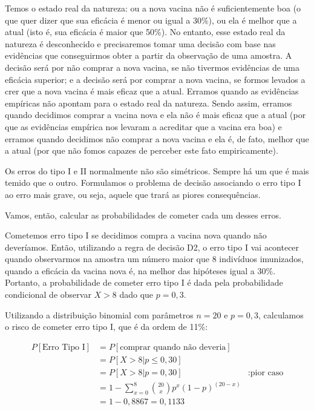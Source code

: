 \documentclass[
]{book}
\theoremstyle{definition}
\theoremstyle{definition}
\theoremstyle{definition}
\theoremstyle{remark}
\begin{document}
Temos o estado real da natureza: ou a nova vacina não é suficientemente boa (o que quer dizer que sua eficácia é menor ou igual a 30\%), ou ela é melhor que a atual (isto é, sua eficácia é maior que 50\%). No entanto, esse estado real da natureza é desconhecido e precisaremos tomar uma decisão com base nas evidências que conseguirmos obter a partir da observação de uma amostra. A decisão será por não comprar a nova vacina, se não tivermos evidências de uma eficácia superior; e a decisão será por comprar a nova vacina, se formos levados a crer que a nova vacina é mais eficaz que a atual. Erramos quando as evidências empíricas não apontam para o estado real da natureza. Sendo assim, erramos quando decidimos comprar a vacina nova e ela não é mais eficaz que a atual (por que as evidências empírica nos levaram a acreditar que a vacina era boa) e erramos quando decidimos não comprar a nova vacina e ela é, de fato, melhor que a atual (por que não fomos capazes de perceber este fato empiricamente).

Os erros do tipo I e II normalmente não são simétricos. Sempre há um que é mais temido que o outro. Formulamos o problema de decisão associando o erro tipo I ao erro mais grave, ou seja, aquele que trará as piores consequências.

Vamos, então, calcular as probabilidades de cometer cada um desses erros.

Cometemos erro tipo I se decidimos compra a vacina nova quando não deveríamos. Então, utilizando a regra de decisão D2, o erro tipo I vai acontecer quando observarmos na amostra um número maior que 8 indivíduos imunizados, quando a eficácia da vacina nova é, na melhor das hipóteses igual a 30\%. Portanto, a probabilidade de cometer erro tipo I é dada pela probabilidade condicional de observar \(X > 8\) dado que \(p = 0,3\).

Utilizando a distribuição binomial com parâmetros \(n = 20\) e \(p = 0,3\), calculamos o risco de cometer erro tipo I, que é da ordem de 11\%:

\begin{align*}
  P[\text{Erro Tipo I}]
    &= P[\text{comprar quando não deveria}] \\
    &= P [X > 8 | p \leq 0,30]\\
    &= P [X > 8 | p  = 0,30] &: \text{pior caso}\\
    &= 1 - \sum_{x=0}^{8} \binom{20}{x} p^x (1-p)^{(20-x)}\\
    &= 1 - 0,8867 = 0,1133
\end{align*}
\end{document}
